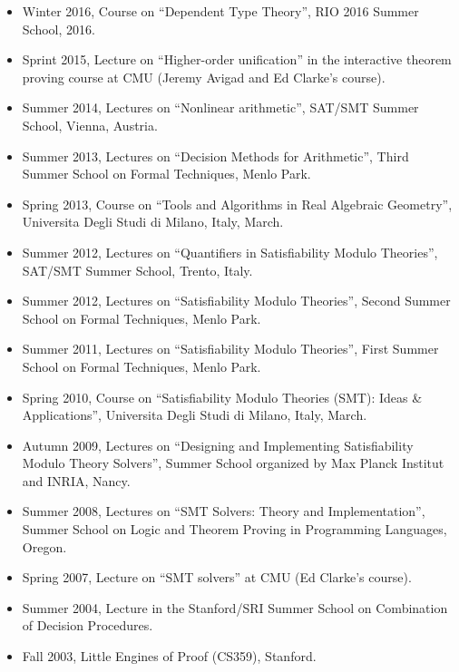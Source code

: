 \documentclass{article}
\begin{document}
\begin{itemize}
\item Winter 2016, Course on ``Dependent Type Theory'', RIO 2016 Summer School, 2016.
\item Sprint 2015, Lecture on ``Higher-order unification'' in the interactive theorem proving course at CMU (Jeremy Avigad and Ed Clarke's course).
\item Summer 2014, Lectures on ``Nonlinear arithmetic'', SAT/SMT Summer School, Vienna, Austria.
\item Summer 2013, Lectures on ``Decision Methods for Arithmetic'', Third Summer School on Formal Techniques, Menlo Park.
\item Spring 2013, Course on ``Tools and Algorithms in Real Algebraic Geometry'', Universita Degli Studi di Milano, Italy, March.
\item Summer 2012, Lectures on ``Quantifiers in Satisfiability Modulo Theories'', SAT/SMT Summer School, Trento, Italy.
\item Summer 2012, Lectures on ``Satisfiability Modulo Theories'', Second Summer School on Formal Techniques, Menlo Park.
\item Summer 2011, Lectures on ``Satisfiability Modulo Theories'', First Summer School on Formal Techniques, Menlo Park.
\item Spring 2010, Course on ``Satisfiability Modulo Theories (SMT): Ideas \& Applications'', Universita Degli Studi di Milano, Italy, March.
\item Autumn 2009, Lectures on ``Designing and Implementing Satisfiability Modulo Theory Solvers'', Summer School organized by Max Planck Institut and INRIA, Nancy.
\item Summer 2008, Lectures on ``SMT Solvers: Theory and Implementation'', Summer School on Logic and Theorem Proving in Programming Languages, Oregon.
\item Spring 2007, Lecture on ``SMT solvers'' at CMU (Ed Clarke's course).
\item Summer 2004, Lecture in the Stanford/SRI Summer School on Combination of Decision Procedures.
\item Fall 2003, Little Engines of Proof (CS359), Stanford.
\end{itemize}


\end{document}
